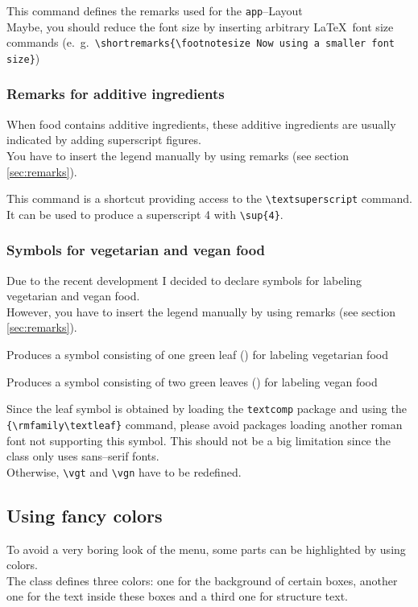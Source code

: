 \documentclass[11pt]{ltxdoc}
\begin{document}
	\medskip
	\DescribeMacro{\shortremarks}
	This command defines the remarks used for the \texttt{app}--Layout \\
	Maybe, you should reduce the font size by inserting arbitrary \LaTeX\ font size commands (e.~g.~\verb|\shortremarks{\footnotesize Now using a smaller font size}|)
	
	
	\subsubsection{Remarks for additive ingredients}
	When food contains additive ingredients, these additive ingredients are usually indicated by adding superscript figures. \\
	You have to insert the legend manually by using remarks (see section \ref{sec:remarks}).
	
	\medskip
	\DescribeMacro{\sup}
	This command is a shortcut providing access to the \verb|\textsuperscript| command. \\
	It can be used to produce a superscript 4 with \verb|\sup{4}|.
	
	
	\subsubsection{Symbols for vegetarian and vegan food}
	Due to the recent development I decided to declare symbols for labeling vegetarian and vegan food. \\
	However, you have to insert the legend manually by using remarks (see section \ref{sec:remarks}).
	
	\medskip
	\DescribeMacro{\vgt}
	Produces a symbol consisting of one green leaf ({\color{green!50!black}\textleaf}) for labeling vegetarian food
	
	\medskip
	\DescribeMacro{\vgn}
	Produces a symbol consisting of two green leaves ({\color{green!50!black}\textleaf\textleaf}) for labeling vegan food
	
	\medskip
	Since the leaf symbol is obtained by loading the \texttt{textcomp} package and using the \verb|{\rmfamily\textleaf}| command, please avoid packages loading another roman font not supporting this symbol. This should not be a big limitation since the class only uses sans--serif fonts. \\
	Otherwise, \verb|\vgt| and \verb|\vgn| have to be redefined.
	
	
	\subsection{Using fancy colors}
	To avoid a very boring look of the menu, some parts can be highlighted by using colors. \\
	The class defines three colors: one for the background of certain boxes, another one for the text inside these boxes and a third one for structure text.
	
\end{document}
